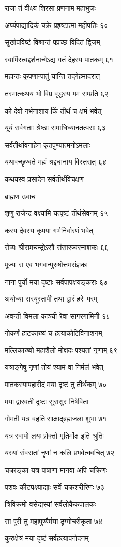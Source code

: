 राजा तं वीक्ष्य शिरसा प्रणनाम महाभुजः

अर्घ्यपाद्यादिकं चक्रे प्रहृष्टात्मा महीपतिः ६०

सुखोपविष्टं विश्रान्तं पप्रच्छ विदितं द्विजम्

स्वामिंस्त्वद्दर्शनान्मेऽद्य गतं देहस्य पातकम् ६१

महान्तः कृपणान्पातुं यान्ति तद्गेहमादरात्

तस्मात्कथय भो विप्र वृद्धस्य मम सम्प्रति ६२

को देवो गर्भनाशाय किं तीर्थं च क्षमं भवेत्

यूयं सर्वगताः श्रेष्ठाः समाधिध्यानतत्पराः ६३

सर्वतीर्थावगाहेन कृतपुण्यात्मनोऽमलाः

यथावच्छृण्वते मह्यं श्रद्दधानाय विस्तरात् ६४

कथयस्व प्रसादेन सर्वतीर्थविचक्षण

ब्राह्मण उवाच

शृणु राजेन्द्र वक्ष्यामि यत्पृष्टं तीर्थसेवनम् ६५

कस्य देवस्य कृपया गर्भनिर्वारणं भवेत्

सेव्यः श्रीरामचन्द्रोऽसौ संसारज्वरनाशकः ६६

पूज्यः स एव भगवान्पुरुषोत्तमसंज्ञकः

नाना पुर्यो मया दृष्टाः सर्वपापक्षयङ्कराः ६७

अयोध्या सरयूस्तापी तथा द्वारं हरेः परम्

अवन्ती विमला काञ्ची रेवा सागरगामिनी ६८

गोकर्णं हाटकाख्यं च हत्याकोटिविनाशनम्

मल्लिकाख्यो महाशैलो मोक्षदः पश्यतां नृणाम् ६९

यत्राङ्गेषु नृणां तोयं श्यामं वा निर्मलं भवेत्

पातकस्यापहारीदं मया दृष्टं तु तीर्थकम् ७०

मया द्वारवती दृष्टा सुरासुर निषेविता

गोमती यत्र वहति साक्षाद्ब्रह्मजला शुभा ७१

यत्र स्वापो लयः प्रोक्तो मृतिर्मोक्ष इति श्रुतिः

यस्यां संवसतां नॄणां न कलि प्रभवेत्क्वचित् ७२

चक्राङ्का यत्र पाषाणा मानवा अपि चक्रिणः

पशवः कीटपक्ष्याद्याः सर्वे चक्रशरीरिणः ७३

त्रिविक्रमो वसेद्यस्यां सर्वलोकैकपालकः

सा पुरी तु महापुण्यैर्मया दृग्गोचरीकृता ७४

कुरुक्षेत्रं मया दृष्टं सर्वहत्यापनोदनम्

